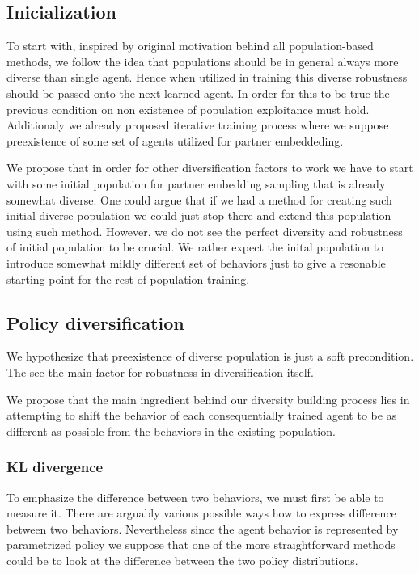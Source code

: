 \subsection{Inicialization}
To start with, inspired by original motivation behind all population-based methods, we follow the idea that populations should be in general always more diverse than single agent.
Hence when utilized in training this diverse robustness should be passed onto the next learned agent.
In order for this to be true the previous condition on non existence of population exploitance must hold.
Additionaly we already proposed iterative training process where we suppose preexistence of some set of agents utilized for partner embeddeding.

We propose that in order for other diversification factors to work we have to start with some initial population for partner embedding sampling that is already somewhat diverse.
One could argue that if we had a method for creating such initial diverse population we could just stop there and extend this population using such method.
However, we do not see the perfect diversity and robustness of initial population to be crucial. 
We rather expect the inital population to introduce somewhat mildly different set of behaviors just to give a resonable starting point for the rest of population training.

\subsection{Policy diversification}
We hypothesize that preexistence of diverse population is just a soft precondition.
The see the main factor for robustness in diversification itself.

We propose that the main ingredient behind our diversity building process lies in attempting to shift the behavior of each consequentially trained agent to be as different as possible from the behaviors in the existing population.

\subsubsection{KL divergence}
To emphasize the difference between two behaviors, we must first be able to measure it.
There are arguably various possible ways how to express difference between two behaviors.
Nevertheless since the agent behavior is represented by parametrized policy we suppose that one of the more straightforward methods could be to look at the difference between the two policy distributions.


